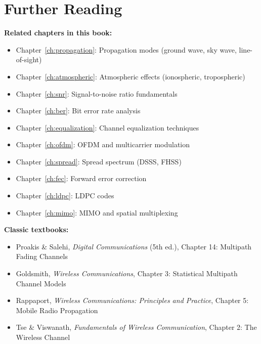 \section{Further Reading}

\textbf{Related chapters in this book:}
\begin{itemize}
\item Chapter~\ref{ch:propagation}: Propagation modes (ground wave, sky wave, line-of-sight)
\item Chapter~\ref{ch:atmospheric}: Atmospheric effects (ionospheric, tropospheric)
\item Chapter~\ref{ch:snr}: Signal-to-noise ratio fundamentals
\item Chapter~\ref{ch:ber}: Bit error rate analysis
\item Chapter~\ref{ch:equalization}: Channel equalization techniques
\item Chapter~\ref{ch:ofdm}: OFDM and multicarrier modulation
\item Chapter~\ref{ch:spread}: Spread spectrum (DSSS, FHSS)
\item Chapter~\ref{ch:fec}: Forward error correction
\item Chapter~\ref{ch:ldpc}: LDPC codes
\item Chapter~\ref{ch:mimo}: MIMO and spatial multiplexing
\end{itemize}

\textbf{Classic textbooks:}
\begin{itemize}
\item Proakis \& Salehi, \textit{Digital Communications} (5th ed.), Chapter 14: Multipath Fading Channels
\item Goldsmith, \textit{Wireless Communications}, Chapter 3: Statistical Multipath Channel Models
\item Rappaport, \textit{Wireless Communications: Principles and Practice}, Chapter 5: Mobile Radio Propagation
\item Tse \& Viswanath, \textit{Fundamentals of Wireless Communication}, Chapter 2: The Wireless Channel
\end{itemize}
